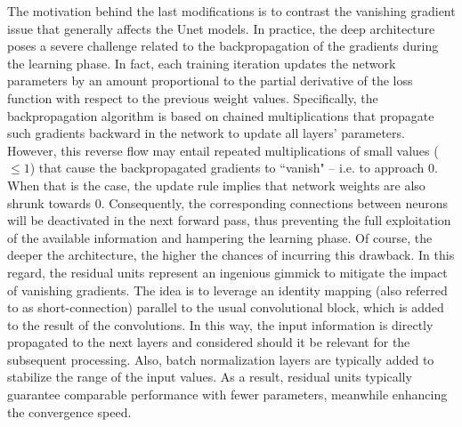 The motivation behind the last modifications is to contrast the vanishing gradient \cite{vanishing_gradient} issue that generally affects the Unet models.
In practice, the deep architecture poses a severe challenge related to the backpropagation of the gradients during the learning phase.
In fact, each training iteration updates the network parameters 
 by an amount proportional to the partial derivative of the loss function with respect to the previous weight values.
Specifically, the backpropagation algorithm is based on chained multiplications that propagate such gradients backward in the network to update all layers' parameters.
However, this reverse flow may entail repeated multiplications of small values ($\leq1$) that cause the backpropagated gradients to ``vanish" -- i.e. to approach 0.
When that is the case, the update rule implies that network weights are also shrunk towards 0.
Consequently, the corresponding connections between neurons will be deactivated in the next forward pass, thus preventing the full exploitation of the available information and hampering the learning phase.
Of course, the deeper the architecture, the higher the chances of incurring this drawback.
In this regard, the residual units represent an ingenious gimmick to mitigate the impact of vanishing gradients.
The idea is to leverage an identity mapping (also referred to as short-connection) parallel to the usual convolutional block, which is added to the result of the convolutions. 
In this way, the input information is directly propagated to the next layers and considered should it be relevant for the subsequent processing.
Also, batch normalization layers are typically added to stabilize the range of the input values.
As a result, residual units typically guarantee comparable performance with fewer parameters, meanwhile enhancing the convergence speed.

